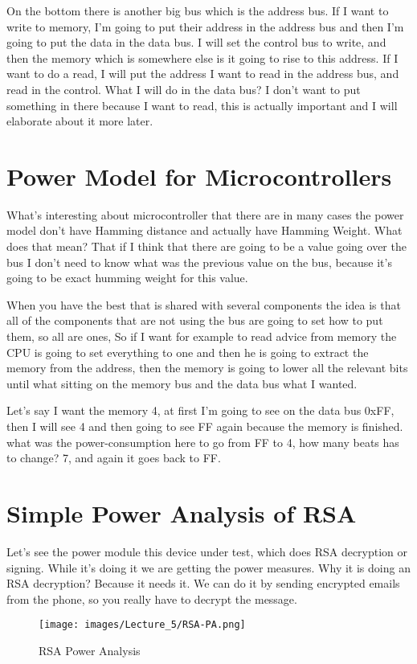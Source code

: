 On the bottom there is another big bus which is the address bus. If I want to
write to memory, I'm going to put their address in the address bus and then I'm
going to put the data in the data bus. I will set the control bus to write, and
then the memory which is somewhere else is it going to rise to this address. If
I want to do a read, I will put the address I want to read in the address bus,
and read in the control. What I will do in the data bus? I don't want to put
something in there because I want to read, this is actually important and I will
elaborate about it more later.

\section{Power Model for Microcontrollers}
What's interesting about microcontroller that there are in many cases the power
model don't have Hamming distance and actually have Hamming Weight. What does
that mean? That if I think that there are going to be a value going over the bus
I don't need to know what was the previous value on the bus, because it's going
to be exact humming weight for this value. 

When you have the best that is shared with several components the idea is that
all of the components that are not using the bus are going to set how to put
them, so all are ones, So if I want for example to read advice from memory the
CPU is going to set everything to one and then he is going to extract the memory
from the address, then the memory is going to lower all the relevant bits until
what sitting on the memory bus and the data bus what I wanted. 

Let's say I want the memory 4, at first I'm going to see on the data bus 0xFF,
then I will see 4 and then going to see FF again because the memory is
finished. what was the power-consumption here to go from FF to 4, how many beats
has to change? 7, and again it goes back to FF.

\section{Simple Power Analysis of RSA}
Let's see the power module this device under test, which does RSA decryption or
signing. While it's doing it we are getting the power measures. Why it is doing
an RSA decryption? Because it needs it. We can do it by sending encrypted emails
from the phone, so you really have to decrypt the message.

\begin{figure}[htp]
\centering
\hspace*{0in}
\texttt{[image: images/Lecture\_5/RSA-PA.png]}
\caption{RSA Power Analysis}\label{fig:RSA Power Analysis}
\end{figure}

